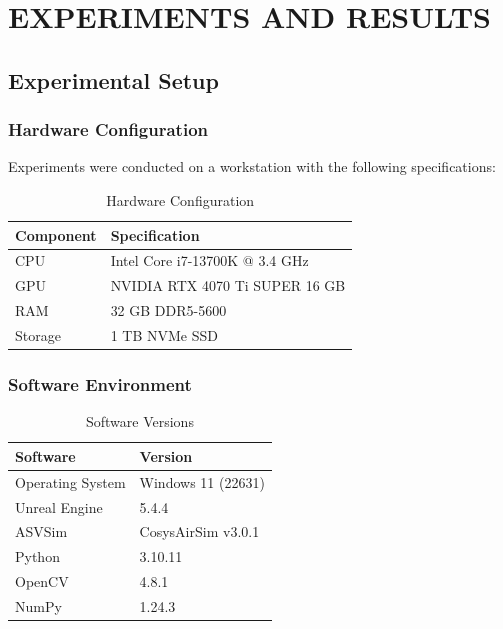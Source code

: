 \clearpage
\section{EXPERIMENTS AND RESULTS}

\subsection{Experimental Setup}

\subsubsection{Hardware Configuration}

Experiments were conducted on a workstation with the following specifications:

\begin{table}[htbp]
\centering
\caption{Hardware Configuration}
\label{tab:hardware}
\begin{tabular}{@{}ll@{}}
\toprule
\textbf{Component} & \textbf{Specification} \\
\midrule
CPU & Intel Core i7-13700K @ 3.4 GHz \\
GPU & NVIDIA RTX 4070 Ti SUPER 16 GB \\
RAM & 32 GB DDR5-5600 \\
Storage & 1 TB NVMe SSD \\
\bottomrule
\end{tabular}
\end{table}

\subsubsection{Software Environment}

\begin{table}[htbp]
\centering
\caption{Software Versions}
\label{tab:software}
\begin{tabular}{@{}ll@{}}
\toprule
\textbf{Software} & \textbf{Version} \\
\midrule
Operating System & Windows 11 (22631) \\
Unreal Engine & 5.4.4 \\
ASVSim & CosysAirSim v3.0.1 \\
Python & 3.10.11 \\
OpenCV & 4.8.1 \\
NumPy & 1.24.3 \\
\bottomrule
\end{tabular}
\end{table}

